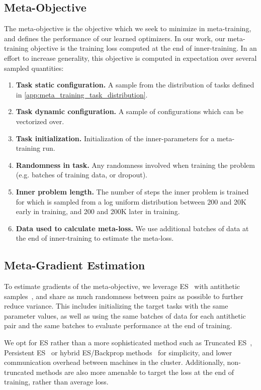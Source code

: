\documentclass[11pt]{article}
\begin{document}
\subsection{Meta-Objective}
The meta-objective is the objective which we seek to minimize in meta-training, and defines the performance of our learned optimizers.
In our work, our meta-training objective is the training loss computed at the end of inner-training. 
In an effort to increase generality, this objective is computed in expectation over several sampled quantities:
\begin{enumerate}
    \item \textbf{Task static configuration.} A sample from the distribution of tasks defined in \ref{app:meta_training_task_distribution}.
    \item \textbf{Task dynamic configuration.} A sample of configurations which can be vectorized over.
    \item \textbf{Task initialization.} Initialization of the inner-parameters for a meta-training run.
    \item \textbf{Randomness in task.} Any randomness involved when training the problem (e.g. batches of training data, or dropout).
    \item \textbf{Inner problem length.} The number of steps the inner problem is trained for which is sampled from a log uniform distribution between 200 and 20K early in training, and 200 and 200K later in training.
    \item \textbf{Data used to calculate meta-loss.} We use additional batches of data at the end of inner-training to estimate the meta-loss.
\end{enumerate}


\subsection{Meta-Gradient Estimation}
To estimate gradients of the meta-objective, we leverage ES~\citep{salimans2017evolution} with antithetic samples~\citep{mcbook}, and share as much randomness between pairs as possible to further reduce variance.
This includes initializing the target tasks with the same parameter values, as well as using the same batches of data for each antithetic pair and the same batches to evaluate performance at the end of training.

We opt for ES rather than a more sophisticated method such as Truncated ES~\citep{metz2019understanding}, Persistent ES~\citep{pmlr-v139-vicol21a} or hybrid ES/Backprop methods~\citep{metz2019understanding} for simplicity, and lower communication overhead between machines in the cluster.
Additionally, non-truncated methods are also more amenable to target the loss at the end of training, rather than average loss.
\end{document}
